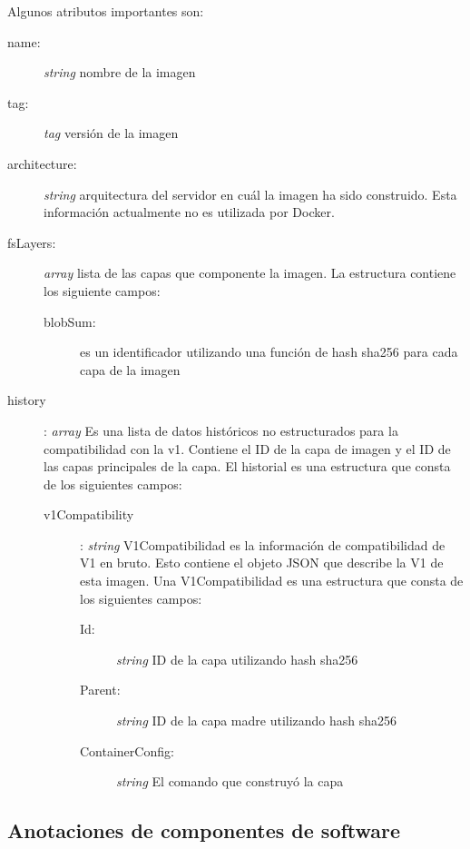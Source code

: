 Algunos atributos importantes son:

\begin{description}
	\item [name:] \textit{string} nombre de la imagen
	\item [tag:] \textit{tag} versión de la imagen
	\item [architecture:] \textit{string} arquitectura del servidor en cuál la imagen ha sido construido. Esta información actualmente no es utilizada por Docker.
	\item [fsLayers:] \textit{array} lista de las capas que componente la imagen.
		La estructura contiene los siguiente campos:
		\begin{description}
			\item [blobSum:] es un identificador utilizando una función de hash sha256 para cada capa de la imagen 
		\end{description}
	\item [history]: \textit{array} Es una lista de datos históricos no estructurados para la compatibilidad con la v1. Contiene el ID de la capa de imagen y el ID de las capas principales de la capa. El historial es una estructura que consta de los siguientes campos:
	\begin{description}
		\item[v1Compatibility]:  \textit{string} V1Compatibilidad es la información de compatibilidad de V1 en bruto. Esto contiene el objeto JSON que describe la V1 de esta imagen. Una V1Compatibilidad es una estructura que consta de los siguientes campos:
		
		\begin{description}
			\item [Id:] \textit{string} ID de la capa utilizando hash sha256			\item [Parent:] \textit{string} ID de la capa madre utilizando hash sha256
				\item [ContainerConfig:] \textit{string} El comando que construyó la capa
		\end{description}
	\end{description}
\end{description}



\subsection{Anotaciones de componentes de software}\label{s4.2.2}

